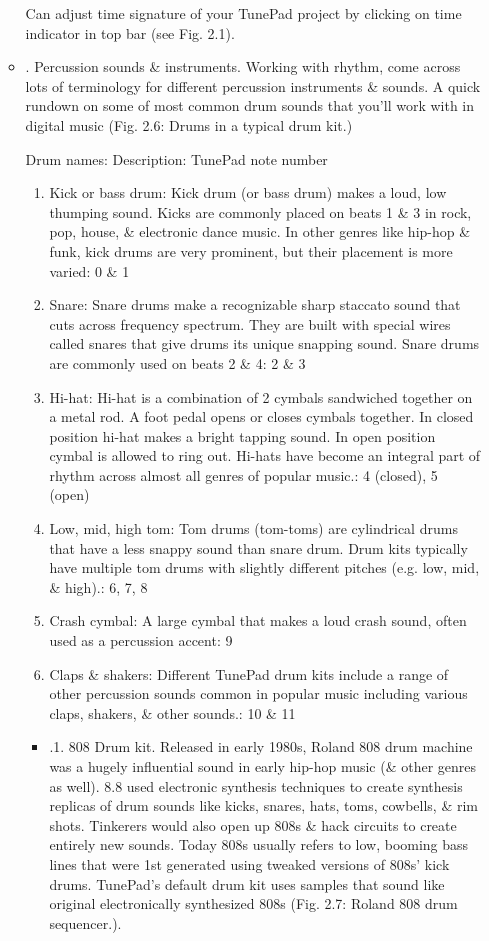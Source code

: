 \documentclass{article}
\begin{document}
\begin{itemize}
\begin{itemize}
		Can adjust time signature of your TunePad project by clicking on time indicator in top bar (see {\sf Fig. 2.1}).		
		\item {. Percussion sounds \& instruments.} Working with rhythm, come across lots of terminology for different percussion instruments \& sounds. A quick rundown on some of most common drum sounds that you'll work with in digital music ({\sf Fig. 2.6: Drums in a typical drum kit.})
		
		{\sf Drum names: Description: TunePad note number}
		\begin{enumerate}
			\item Kick or bass drum: Kick drum (or bass drum) makes a loud, low thumping sound. Kicks are commonly placed on beats 1 \& 3 in rock, pop, house, \& electronic dance music. In other genres like hip-hop \& funk, kick drums are very prominent, but their placement is more varied: 0 \& 1
			\item Snare: Snare drums make a recognizable sharp staccato sound that cuts across frequency spectrum. They are built with special wires called snares that give drums its unique snapping sound. Snare drums are commonly used on beats 2 \& 4: 2 \& 3
			\item Hi-hat: Hi-hat is a combination of 2 cymbals sandwiched together on a metal rod. A foot pedal opens or closes cymbals together. In closed position hi-hat makes a bright tapping sound. In open position cymbal is allowed to ring out. Hi-hats have become an integral part of rhythm across almost all genres of popular music.: 4 (closed), 5 (open)
			\item Low, mid, high tom: Tom drums (tom-toms) are cylindrical drums that have a less snappy sound than snare drum. Drum kits typically have multiple tom drums with slightly different pitches (e.g. low, mid, \& high).: 6, 7, 8
			\item Crash cymbal: A large cymbal that makes a loud crash sound, often used as a percussion accent: 9
			\item Claps \& shakers: Different TunePad drum kits include a range of other percussion sounds common in popular music including various claps, shakers, \& other sounds.: 10 \& 11
		\end{enumerate}
		\begin{itemize}
			\item {.1. 808 Drum kit.} Released in early 1980s, Roland 808 drum machine was a hugely influential sound in early hip-hop music (\& other genres as well). 8.8 used electronic synthesis techniques to create synthesis replicas of drum sounds like kicks, snares, hats, toms, cowbells, \& rim shots. Tinkerers would also open up 808s \& hack circuits to create entirely new sounds. Today 808s usually refers to low, booming bass lines that were 1st generated using tweaked versions of 808s' kick drums. TunePad's default drum kit uses samples that sound like original electronically synthesized 808s ({\sf Fig. 2.7: Roland 808 drum sequencer.}).

\end{itemize}
\end{itemize}
\end{itemize}
\end{document}
